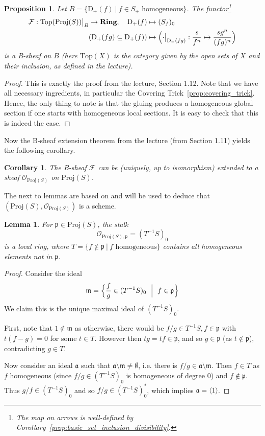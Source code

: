 \documentclass{scrartcl}
\newcommand{\D}[1]{\mathrm{D}_+(#1)}
\newcommand{\p}{\mathfrak{p}}
\newcommand{\m}{\mathfrak{m}}
\renewcommand{\a}{\mathfrak{a}}
\renewcommand{\m}{\mathfrak{m}}
\newcommand{\Ring}{\mathrm{\textbf{Ring}}}
\newcommand{\Top}{\mathrm{Top}}
\newcommand{\Proj}{\mathrm{Proj}}
\renewcommand{\O}{\mathcal{O}}
\newcommand\restr[2]{{
    \left.\kern-\nulldelimiterspace
    #1
    \vphantom{\big|}
    \right|_{#2}
}}
\newtheorem{prop}[subsection]{Proposition}
\newtheorem{lemma}[subsection]{Lemma}
\newtheorem{corollary}[subsection]{Corollary}
\theoremstyle{definition}
\begin{document}
\begin{prop}
    Let $B = \{ \D{f} \ | \ \text{$f \in S_+$ homogeneous}\}$.
    The functor\footnote{The map on arrows is well-defined by Corollary~\ref{prop:basic_set_inclusion_divisibility}.}
    \begin{align*}
        \mathcal{F}: \restr{\Top(\Proj(S))}{B} \to \Ring, \quad \D{f} &\mapsto (S_f)_0 \\
        (\D{fg} \subseteq \D{f}) &\mapsto \Bigl( \restr{\cdot}{\D{fg}}: \frac s {f^n} \mapsto \frac {sg^n} {(fg)^n} \Bigr)
    \end{align*}
    is a B-sheaf on $B$ (here $\Top(X)$ is the category given by the open sets of $X$ and their inclusion, as defined in the lecture).
\end{prop}
\begin{proof}
    This is exactly the proof from the lecture, Section 1.12.
    Note that we have all necessary ingredients, in particular the Covering Trick~\ref{prop:covering_trick}.
    Hence, the only thing to note is that the gluing produces a homogeneous global section if one starts with homogeneous local sections.
    It is easy to check that this is indeed the case.
\end{proof}
Now the B-sheaf extension theorem from the lecture (from Section 1.11) yields the following corollary.
\begin{corollary}
    The B-sheaf $\mathcal{F}$ can be (uniquely, up to isomorphism) extended to a sheaf $\O_{\Proj(S)}$ on $\Proj(S)$.
\end{corollary}
The next to lemmas are based on \cite[Prop. II.2.5]{hartshorne} and will be used to deduce that $(\Proj(S), \O_{\Proj(S)})$ is a scheme.
\begin{lemma}
    For $\p \in \Proj(S)$, the stalk
    \begin{equation*}
        \O_{\Proj(S), \p} = (T^{-1}S)_0
    \end{equation*}
    is a local ring, where $T = \{ f \notin \p \ | \ \text{$f$ homogeneous}\}$ contains all homogeneous elements not in $\p$.
\end{lemma}
\begin{proof}
    Consider the ideal
    \begin{equation*}
        \m = \Bigl\{ \frac f g \in (T^{-1}S)_0 \ \Bigm| \ f \in \p \Bigr\}
    \end{equation*}
    We claim this is the unique maximal ideal of $(T^{-1}S)_0$.

    First, note that $1 \notin \m$ as otherwise, there would be $f/g \in T^{-1}S, f \in \p$ with $t(f - g) = 0$ for some $t \in T$.
    However then $tg = tf \in \p$, and so $g \in \p$ (as $t \notin \p$), contradicting $g \in T$.
    
    Now consider an ideal $\a$ such that $\a \setminus \m \neq \emptyset$, i.e. there is $f/g \in \a \setminus \m$.
    Then $f \in T$ as $f$ homogeneous (since $f/g \in (T^{-1}S)_0$ is homogeneous of degree 0) and $f \notin \p$.
    Thus $g/f \in (T^{-1}S)_0$ and so $f/g \in (T^{-1}S)_0^*$, which implies $\a = \langle 1 \rangle$.
\end{proof}
\end{document}
